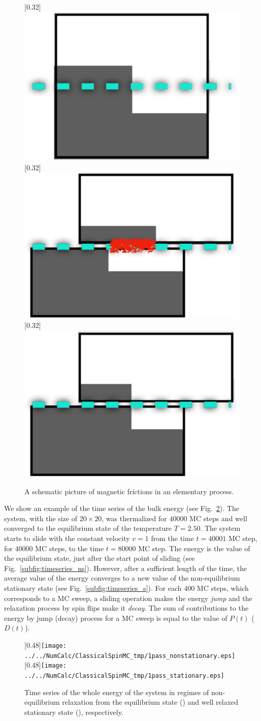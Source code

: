 \begin{figure}[htbp]
	\centering
	\subcaptionbox{\label{subcap:snapshot1}}[0.32\linewidth]{\includegraphics[width=0.25\linewidth]{Snapshot1.pdf}}
	\subcaptionbox{\label{subcap:snapshot2}}[0.32\linewidth]{\includegraphics[width=0.25\linewidth]{Snapshot2.pdf}}
	\subcaptionbox{\label{subcap:snapshot3}}[0.32\linewidth]{\includegraphics[width=0.25\linewidth]{Snapshot3.pdf}}
	
	\caption{A schematic picture of magnetic frictions in an elementary process.}
	\label{fig:snapshots}
\end{figure}

We show an example of the time series of the bulk energy (see Fig.~\ref{fig:timeseries}). The system, with the size of $20\times 20$, was thermalized for $40000$ MC steps and well converged to the equilibrium state of the temperature $T=2.50$. The system starts to slide with the constant velocity $v=1$ from the time $t=40001$ MC step, for $40000$ MC steps, to the time $t=80000$ MC step. The energy is the value of the equilibrium state, just after the start point of sliding (see Fig.~\ref{subfig:timeseries_ns}). However, after a sufficient length of the time, the average value of the energy converges to a new value of the non-equilibrium stationary state (see Fig.~\ref{subfig:timeseries_s}). For each $400$ MC steps, which corresponds to a MC sweep, a sliding operation makes the energy \textit{jump} and the relaxation process by spin flips make it \textit{decay}. The sum of contributions to the energy by jump (decay) process for a MC sweep is equal to the value of $P(t)$ ($D(t)$).

\begin{figure}[htbp]
	\centering
	\subcaptionbox{\label{subcap:timeseries_ns}}[0.48\linewidth]{\texttt{[image: ../../NumCalc/ClassicalSpinMC\_tmp/1pass\_nonstationary.eps]}}
	\subcaptionbox{\label{subcap:timeseries_s}}[0.48\linewidth]{\texttt{[image: ../../NumCalc/ClassicalSpinMC\_tmp/1pass\_stationary.eps]}}
	
	\caption{Time series of the whole energy of the system in regimes of non-equilibrium relaxation from the equilibrium state () and well relaxed stationary state (), respectively.}
	\label{fig:timeseries}
\end{figure}

